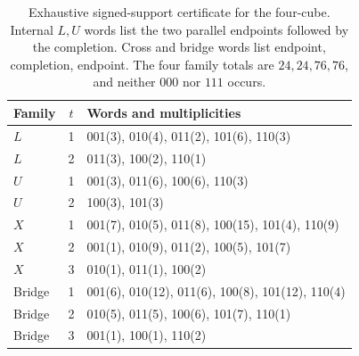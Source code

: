 \documentclass[11pt,a4paper]{article}
\theoremstyle{definition}
\numberwithin{equation}{section}
\begin{document}
\begin{table}[!htbp]
	\centering
	\caption{Exhaustive signed-support certificate for the four-cube. Internal $L,U$ words list the two parallel endpoints followed by the completion. Cross and bridge words list endpoint, completion, endpoint. The four family totals are $24,24,76,76$, and neither $000$ nor $111$ occurs.}
	\label{tab:fourtruth}
	\begin{tabular}{@{}lcl@{}}
		\toprule Family&$t$&Words and multiplicities\\\midrule
		$L$&1&001(3), 010(4), 011(2), 101(6), 110(3)\\
		$L$&2&011(3), 100(2), 110(1)\\
		$U$&1&001(3), 011(6), 100(6), 110(3)\\
		$U$&2&100(3), 101(3)\\
		$X$&1&001(7), 010(5), 011(8), 100(15), 101(4), 110(9)\\
		$X$&2&001(1), 010(9), 011(2), 100(5), 101(7)\\
		$X$&3&010(1), 011(1), 100(2)\\
		Bridge&1&001(6), 010(12), 011(6), 100(8), 101(12), 110(4)\\
		Bridge&2&010(5), 011(5), 100(6), 101(7), 110(1)\\
		Bridge&3&001(1), 100(1), 110(2)\\\bottomrule
	\end{tabular}
\end{table}
\end{document}
